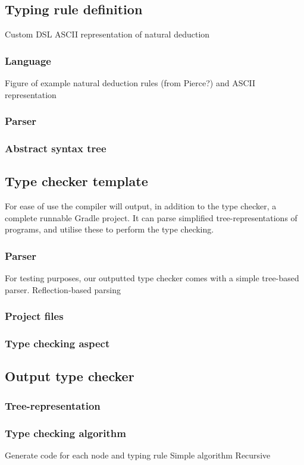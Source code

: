 \documentclass[nofilelist]{cslthse-msc}
\begin{document}
\subsection{Typing rule definition}
Custom DSL
ASCII representation of natural deduction %
\subsubsection{Language}
Figure of example natural deduction rules (from Pierce?) and ASCII representation
\subsubsection{Parser}
\subsubsection{Abstract syntax tree}

\subsection{Type checker template}
For ease of use the compiler will output, in addition to the type checker, a complete runnable Gradle project.
It can parse simplified tree-representations of programs, and utilise these to perform the type checking.
\subsubsection{Parser}
For testing purposes, our outputted type checker comes with a simple tree-based parser.
Reflection-based parsing
\subsubsection{Project files}
\subsubsection{Type checking aspect}

\subsection{Output type checker}
\subsubsection{Tree-representation}
\subsubsection{Type checking algorithm}
Generate code for each node and typing rule
Simple algorithm
Recursive
\end{document}
